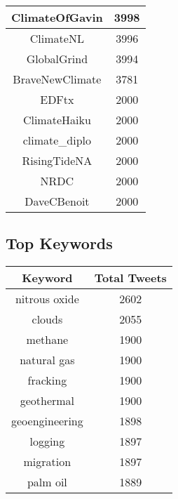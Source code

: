 \documentclass{article}\usepackage[T1]{fontenc}
\begin{document}
\begin{center}
\begin{tabular}{|c|c|}
 \hline
ClimateOfGavin & 3998\\ 
 \hline
ClimateNL & 3996\\ 
 \hline
GlobalGrind & 3994\\ 
 \hline
BraveNewClimate & 3781\\ 
 \hline
EDFtx & 2000\\ 
 \hline
ClimateHaiku & 2000\\ 
 \hline
climate\_diplo & 2000\\ 
 \hline
RisingTideNA & 2000\\ 
 \hline
NRDC & 2000\\ 
 \hline
DaveCBenoit & 2000\\ 
 \hline
\end{tabular}\end{center}\subsection*{Top Keywords}\begin{center}         \begin{tabular}{|c|c|}         \hline         Keyword & Total Tweets \\ 
 \hline
nitrous oxide & 2602\\ 
 \hline
clouds & 2055\\ 
 \hline
methane & 1900\\ 
 \hline
natural gas & 1900\\ 
 \hline
fracking & 1900\\ 
 \hline
geothermal & 1900\\ 
 \hline
geoengineering & 1898\\ 
 \hline
logging & 1897\\ 
 \hline
migration & 1897\\ 
 \hline
palm oil & 1889\\ 
 \hline
\end{tabular}\end{center}
\end{document}
